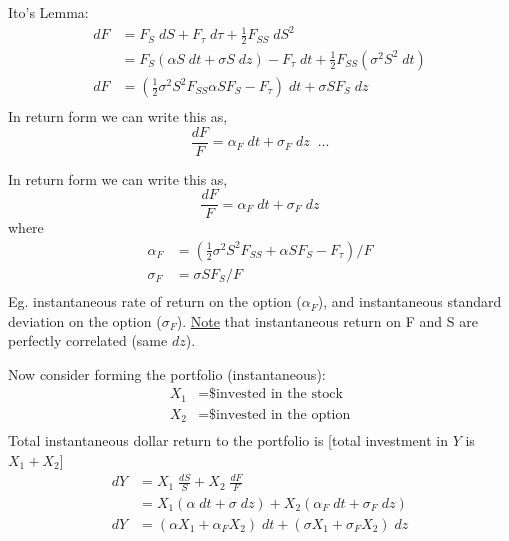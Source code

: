\documentclass[
14pt,notheorems,hyperref={pdfauthor=whatever}
]{beamer}
\begin{document}
\begin{frame}
Ito's Lemma:\\
\hfill\break
\begin{align*}
    dF &= F_S\;dS+F_\tau\;d\tau+\frac{1}{2}F_{SS}\;dS^2\\
    &= F_S(\alpha S\;dt+\sigma S\;dz)-F_\tau \;dt + \frac{1}{2}F_{SS}(\sigma^2 S^2\;dt)\\
    dF &= (\frac{1}{2}\sigma^2 S^2 F_{SS}\alpha S F_S - F_\tau)\;dt + \sigma S F_S \;dz\\
\end{align*}
In return form we can write this as,\\
\[\frac{dF}{F} = \alpha_F\;dt+\sigma_F\;dz \;\;\text{...}\]
\end{frame}

\begin{frame}
In return form we can write this as,\\
\[\frac{dF}{F} = \alpha_F\;dt+\sigma_F\;dz\]
where\\
\begin{align*}
    \alpha_F &= (\frac{1}{2} \sigma^2 S^2 F_{SS} + \alpha S F_S - F_\tau) / F\\
    \sigma_F &= \sigma S F_S / F\\
\end{align*}
Eg. instantaneous rate of return on the option ($\alpha_F$), and instantaneous standard deviation on the option ($\sigma_F$). \underline{Note} that instantaneous return on F and S are perfectly correlated (same $dz$).\\
\end{frame}

\begin{frame}
Now consider forming the portfolio (instantaneous):
\begin{align*}
    X_1 &= \text{\$ invested in the stock}\\
    X_2 &= \text{\$ invested in the option}\\
\end{align*}
Total instantaneous dollar return to the portfolio is [total investment in $Y$ is $X_1+X_2$]\\
\begin{align*}
    dY &= X_1\;\frac{dS}{S}+X_2\;\frac{dF}{F}\\
    &= X_1(\alpha\;dt + \sigma\;dz)+X_2(\alpha_F\;dt + \sigma_F\;dz)\\
    dY &= (\alpha X_1 + \alpha_F X_2)\;dt+(\sigma X_1 + \sigma_F X_2)\;dz\\
\end{align*}
\end{frame}
\end{document}
